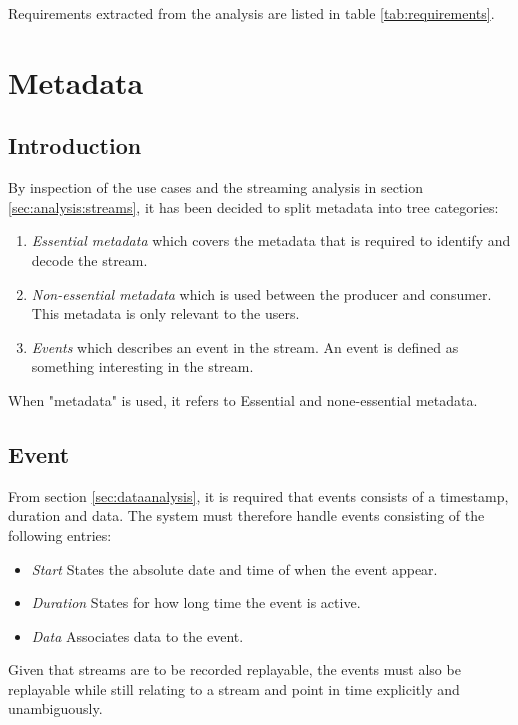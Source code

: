 Requirements extracted from the analysis are listed in table \ref{tab:requirements}.

\section{Metadata} \label{sec:analysis:metadata}
\subsection{Introduction}

By inspection of the use cases and the streaming analysis in section \ref{sec:analysis:streams}, it has been decided to split metadata into tree categories:
\begin{enumerate}
	\item \textit{Essential metadata} which covers the metadata that is required to identify and decode the stream.
	\item \textit{Non-essential metadata} which is used between the producer and consumer. This metadata is only relevant to the users.
	\item \textit{Events} which describes an event in the stream. An event is defined as something interesting in the stream.
\end{enumerate}

When "metadata" is used, it refers to Essential and none-essential metadata.
\subsection{Event} \label{sec:analysis:event}
From section \ref{sec:dataanalysis}, it is required that events consists of a timestamp, duration and data. The system must therefore handle events consisting of the following entries:
\begin{itemize}
	\item \textit{Start} States the absolute date and time of when the event appear. 
	\item \textit{Duration} States for how long time the event is active.
	\item \textit{Data} Associates data to the event. 
\end{itemize}

Given that streams are to be recorded replayable, the events must also be replayable while still relating to a stream and point in time explicitly and unambiguously.

